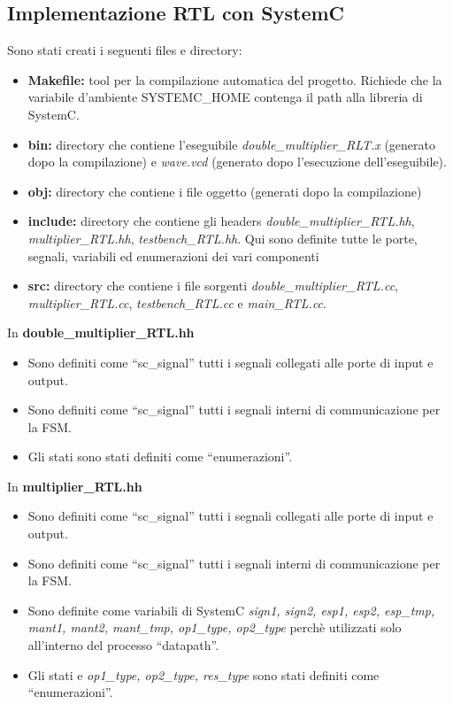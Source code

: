 \documentclass[]{IEEEtran}
\begin{document}
\subsection{Implementazione RTL con SystemC \label{section:SystemC}}
Sono stati creati i seguenti files e directory:
\begin{itemize}
    \item \textbf{Makefile:} tool per la compilazione automatica del progetto. Richiede che la variabile d'ambiente SYSTEMC\_HOME contenga il path alla libreria di SystemC.
    \item \textbf{bin:} directory che contiene l'eseguibile \textit{double\_multiplier\_RLT.x} (generato dopo la compilazione) e \textit{wave.vcd} (generato dopo l'esecuzione dell'eseguibile).
    \item \textbf{obj:} directory che contiene i file oggetto (generati dopo la compilazione)
    \item \textbf{include:} directory che contiene gli headers \textit{double\_multiplier\_RTL.hh}, \textit{multiplier\_RTL.hh}, \textit{testbench\_RTL.hh}. Qui sono definite tutte le porte, segnali, variabili ed enumerazioni dei vari componenti
    \item \textbf{src:} directory che contiene i file sorgenti \textit{double\_multiplier\_RTL.cc}, \textit{multiplier\_RTL.cc}, \textit{testbench\_RTL.cc} e \textit{main\_RTL.cc}.
\end{itemize}
In \textbf{double\_multiplier\_RTL.hh}
\begin{itemize}
    \item Sono definiti come ``sc\_signal'' tutti i segnali collegati alle porte di input e output.
    \item Sono definiti come ``sc\_signal'' tutti i segnali interni di communicazione per la FSM.
    \item Gli stati sono stati definiti come ``enumerazioni''.
\end{itemize}
In \textbf{multiplier\_RTL.hh}
\begin{itemize}
    \item Sono definiti come ``sc\_signal'' tutti i segnali collegati alle porte di input e output.
    \item Sono definiti come ``sc\_signal'' tutti i segnali interni di communicazione per la FSM.
    \item Sono definite come variabili di SystemC \textit{sign1, sign2, esp1, esp2, esp\_tmp, mant1, mant2, mant\_tmp, op1\_type, op2\_type} perchè utilizzati solo all'interno del processo ``datapath''.
    \item Gli stati e \textit{op1\_type, op2\_type, res\_type} sono stati definiti come ``enumerazioni''.
\end{itemize}
\end{document}
